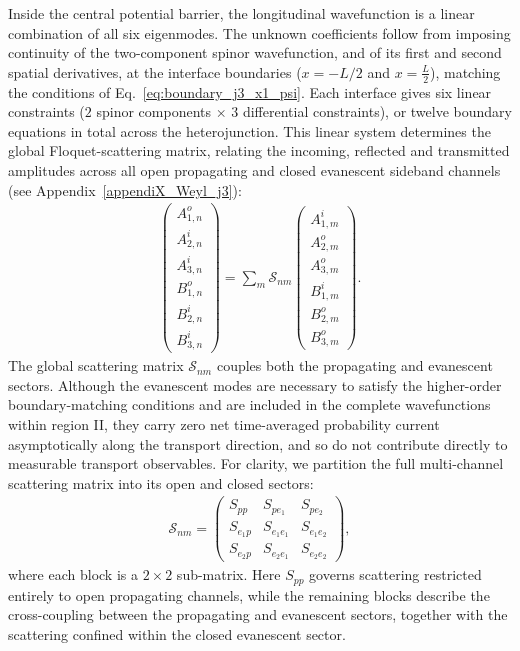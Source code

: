 \documentclass[aps,prb,onecolumn,longbibliography,nofootinbib,citeautoscript,10pt]{revtex4-2}
\begin{document}
Inside the central potential barrier, the longitudinal wavefunction is a linear combination of all six eigenmodes. The unknown coefficients follow from imposing continuity of the two-component spinor wavefunction, and of its first and second spatial derivatives, at the interface boundaries ($x = -L/2$ and $x = \frac{L} {2}$), matching the conditions of Eq.~\eqref{eq:boundary_j3_x1_psi}. Each interface gives six linear constraints ($2$ spinor components $\times$ $3$ differential constraints), or twelve boundary equations in total across the heterojunction. This linear system determines the global Floquet-scattering matrix, relating the incoming, reflected and transmitted amplitudes across all open propagating and closed evanescent sideband channels (see Appendix~\ref{appendiX_Weyl_j3}):
\begin{align}
\begin{pmatrix}
A_{1,n}^{o} \\
A_{2,n}^{i} \\
A_{3,n}^{i} \\
B_{1,n}^{o} \\
B_{2,n}^{i} \\
B_{3,n}^{i}
\end{pmatrix}
= \sum_m \mathcal{S}_{nm} \begin{pmatrix}
A_{1,m}^{i} \\
A_{2,m}^{o} \\
A_{3,m}^{o} \\
B_{1,m}^{i} \\
B_{2,m}^{o} \\
B_{3,m}^{o}
\end{pmatrix}.
\label{eq:j3_global_S_matrix}
\end{align}
The global scattering matrix $\mathcal{S}_{nm}$ couples both the propagating and evanescent sectors. Although the evanescent modes are necessary to satisfy the higher-order boundary-matching conditions and are included in the complete wavefunctions within region II, they carry zero net time-averaged probability current asymptotically along the transport direction, and so do not contribute directly to measurable transport observables. For clarity, we partition the full multi-channel scattering matrix into its open and closed sectors:
\begin{align}
\mathcal{S}_{nm} = \begin{pmatrix}
S_{pp} & S_{pe_1} & S_{pe_2} \\
S_{e_1p} & S_{e_1e_1} & S_{e_1e_2} \\
S_{e_2p} & S_{e_2e_1} & S_{e_2e_2}
\end{pmatrix} , 
\label{eq:j3_partitioneD_S_matrix}
\end{align}
where each block is a $2 \times 2$ sub-matrix. Here $S_{pp}$ governs scattering restricted entirely to open propagating channels, while the remaining blocks describe the cross-coupling between the propagating and evanescent sectors, together with the scattering confined within the closed evanescent sector.
\end{document}
